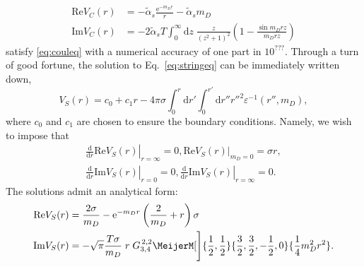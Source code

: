 \documentclass[12pt,a4paper]{article}
\newcommand\MeijerG[8][]{%
  G^{\,#2,#3}_{#4,#5}\MeijerM[#1]{#6}{#7}{#8}}
\begin{document}
\begin{align}
\mathrm{Re}V_C\!\left(r\right)&=-\tilde{\alpha}_s\frac{\mathrm{e}^{-m_D r}}{r}-\tilde{\alpha}_s m_D \\
\mathrm{Im}V_C\!\left(r\right)&=-2\tilde{\alpha}_sT\int_{0}^{\infty}\mathrm{d}z\;\frac{z}{\left(z^2+1\right)^2}\left(1-\frac{\sin m_D r z}{m_D r z}\right)
\end{align}
satisfy \eqref{eq:couleq} with a numerical accuracy of one part in \(10^{???}\).
Through a turn of good fortune, the solution to Eq.~\eqref{eq:stringeq} can be immediately written down,
\begin{equation}
V_{S}\!\left(r\right)= c_0 + c_1r-4\pi\sigma\int_{0}^{r}\mathrm{d}r'\int_{0}^{r'}\mathrm{d}r'' {r''}^2\varepsilon^{-1}\!\left(r'',m_{D}\right),
\end{equation}
where \(c_0\) and \(c_1\) are chosen to ensure the boundary conditions. Namely, we wish to impose that
\begin{align}
\left.\frac{\mathrm{d}}{\mathrm{d}r}\mathrm{Re}V_S\!\left(r\right)\right|_{r=\infty}=0, \left.\mathrm{Re}V_S\!\left(r\right)\right|_{m_D=0}=\sigma r, \\
\left.\frac{\mathrm{d}}{\mathrm{d}r}\mathrm{Im}V_S\!\left(r\right)\right|_{r=0}=0, \left.\frac{\mathrm{d}}{\mathrm{d}r}\mathrm{Im}V_S\!\left(r\right)\right|_{r=\infty}=0.
\end{align}
The solutions admit an analytical form:
\begin{align}
\mathrm{Re}V_S\!\left(r\right)&=\frac{2\sigma}{m_D}-\mathrm{e}^{-m_D r}\left(\frac{2}{m_D}+r\right)\sigma \\
\mathrm{Im}V_S\!\left(r\right)&=-\sqrt{\pi}\frac{T\sigma}{m_D}\;r\;\MeijerG[\Bigg]{2}{2}{3}{4}{\frac{1}{2},\frac{1}{2}}{\frac{3}{2},\frac{3}{2},-\frac{1}{2},0}{\frac{1}{4}m_D^2r^2}.
\end{align}
\end{document}
